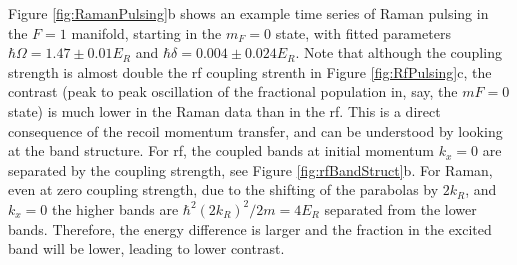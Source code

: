 Figure \ref{fig:RamanPulsing}b shows an example time series of Raman pulsing in the $F=1$ manifold, starting in the $m_F=0$ state, with fitted parameters  $\hbar\Omega=1.47\pm0.01 E_R$ and $\hbar\delta = 0.004\pm0.024 E_R$. Note that although the coupling strength is almost double the rf coupling strenth in Figure \ref{fig:RfPulsing}c, the contrast (peak to peak oscillation of the fractional population in, say, the $mF=0$ state) is much lower in the Raman data than in the rf. This is a direct consequence of the recoil momentum transfer, and can be understood by looking at the band structure. For rf, the coupled bands at initial momentum $k_x=0$ are separated by the coupling strength, see Figure \ref{fig:rfBandStruct}b. For Raman, even at zero coupling strength, due to the shifting of the parabolas by $2k_R$, and $k_x=0$ the higher bands are $\hbar^2(2k_R)^2/2m=4E_R$ separated from the lower bands. Therefore, the energy difference is larger and the fraction in the excited band will be lower, leading to lower contrast. 





